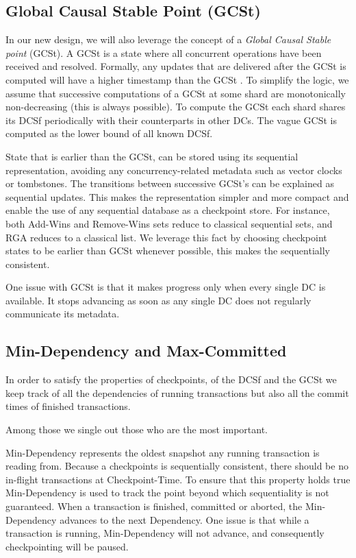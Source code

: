 \documentclass[twoside]{article}
\begin{document}
\subsection{Global Causal Stable Point (GCSt)}
\label{sec:causal-stable-snapshot}

In our new design, we will also leverage the concept of a
\emph{Global Causal Stable point} (GCSt).
A GCSt is a state where all concurrent operations have been received and
resolved.
Formally, any updates that are delivered after the GCSt is computed will
have a higher timestamp than the GCSt
\cite[Definition~5.1]{app:rep:1800}.
To simplify the logic, we assume that successive computations of a GCSt
at some shard are monotonically non-decreasing (this is always
possible).
To compute the GCSt each shard shares its DCSf periodically with their
counterparts in other DCs. 
The vague GCSt is computed as the lower bound of all known DCSf.

State that is earlier than the GCSt, can be stored using its 
sequential representation, avoiding any concurrency-related metadata such as
vector clocks or tombstones.
The transitions between successive GCSt's can be explained as sequential
updates.
This makes the representation simpler and more compact and enable the 
use of any sequential database as a checkpoint store.
For instance, both Add-Wins and Remove-Wins sets reduce to classical
sequential sets, and RGA reduces to a classical list.
We leverage this fact by choosing checkpoint states to be earlier than 
GCSt whenever possible, this makes the sequentially consistent.

One issue with GCSt is that it makes progress only when every single DC
is available.
It stops advancing as soon as any single DC does not regularly communicate its
metadata.

\subsection{Min-Dependency and Max-Committed}
\label{sec:dep-commit}
In order to satisfy the properties of checkpoints, of the DCSf and the GCSt we keep
track of all the dependencies of running transactions but also all the commit
times of finished transactions. 

Among those we single out those who are the most important.

Min-Dependency represents the oldest snapshot any
running transaction is reading from. 
Because a checkpoints is sequentially consistent, there should be 
no in-flight transactions at Checkpoint-Time.
To ensure that this property holds true Min-Dependency is used to track the point
beyond which sequentiality is not guaranteed.
When a transaction is finished, committed or aborted, the Min-Dependency
advances to the next Dependency. 
One issue is that while a transaction is running, Min-Dependency
will not advance, and consequently checkpointing will be paused.
\end{document}
